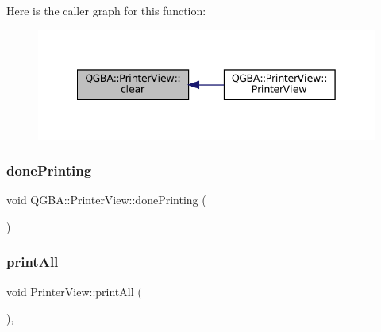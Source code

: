 Here is the caller graph for this function\+:
\nopagebreak
\begin{figure}[H]
\begin{center}
\leavevmode
\includegraphics[width=342pt]{class_q_g_b_a_1_1_printer_view_a92761518133141eb63987760778ec741_icgraph}
\end{center}
\end{figure}
\mbox{\label{class_q_g_b_a_1_1_printer_view_afae07552ce85ba81355434d6c949d46c}} 
\subsubsection{\texorpdfstring{done\+Printing}{donePrinting}}
{\footnotesize\ttfamily void Q\+G\+B\+A\+::\+Printer\+View\+::done\+Printing (\begin{DoxyParamCaption}{ }\end{DoxyParamCaption})\hspace{0.3cm}{\ttfamily [signal]}}

\mbox{\label{class_q_g_b_a_1_1_printer_view_a194a0d28136e593ada362ba98a2a69a8}} 
\subsubsection{\texorpdfstring{print\+All}{printAll}}
{\footnotesize\ttfamily void Printer\+View\+::print\+All (\begin{DoxyParamCaption}{ }\end{DoxyParamCaption})\hspace{0.3cm}{\ttfamily [private]}, {\ttfamily [slot]}}

